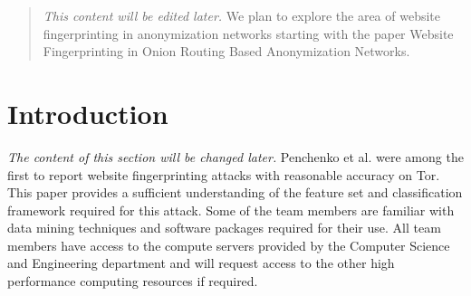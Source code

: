 \documentclass{sig-alternate-05-2015}
\begin{document}
\author{
\alignauthor
Vaibhav Sharma\\%
\alignauthor
Taejoon Byun\\
\and  %
\alignauthor Se Eun Oh\\%
\alignauthor
Elaheh Ghassabani\\
}

\maketitle
\begin{abstract}
\emph{This content will be edited later.} We plan to explore the area of website fingerprinting in anonymization networks starting with the paper Website Fingerprinting in Onion Routing Based Anonymization Networks.
\end{abstract}



\section{Introduction}
\emph{The content of this section will be changed later.} Penchenko et al. \cite{panchenko11} were among the first to report website fingerprinting attacks with reasonable accuracy on Tor. This paper provides a sufficient understanding of the feature set and classification framework required for this attack. Some of the team members are familiar with data mining techniques and software packages required for their use. All team members have access to the compute servers provided by the Computer Science and Engineering department and will request access to the other high performance computing resources if required.
\end{document}
